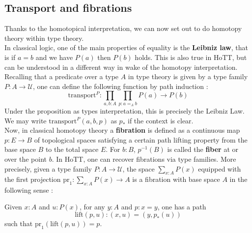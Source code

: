 \documentclass{report}
\begin{document}
\subsection{Transport and fibrations}
Thanks to the homotopical interpretation, we can now set out to do homotopy theory within type theory.\\
In classical logic, one of the main properties of equality is the \textbf{Leibniz law}, that is if $a=b$ and we have $P(a)$ then $P(b)$ holds. This is also true in HoTT, but can be understood in a different way in wake of the homotopy interpretation. Recalling that a predicate over a type $A$ in type theory is given by a type family $P : A \rightarrow \mathcal{U}$, one can define the following function by path induction :
$$\mathrm{transport}^P : \prod_{a,b : A} \prod_{p : a=_A b} P(a) \rightarrow P(b)$$
Under the proposition as types interpretation, this is precisely the Leibniz Law. We may write $\mathrm{transport}^P(a,b,p)$ as $p_*$ if the context is clear.\\
Now, in classical homotopy theory a \textbf{fibration} is defined as a continuous map $p : E \rightarrow B$ of topological spaces satisfying a certain path lifting property from the base space $B$ to the total space $E$. For $b : B$, $p^{-1}(B)$ is called the \textbf{fiber} at or over the point $b$. In HoTT, one can recover fibrations via type families. More precisely, given a type family $P : A \rightarrow \mathcal{U}$, the space $ \sum_{x : A} P(x)$ equipped with the first projection $\mathrm{pr}_1 : \sum_{x : A} P(x) \rightarrow A$ is a fibration with base space $A$ in the following sense : 
\begin{prop}
  Given $x : A$ and $u : P(x)$, for any $y : A$ and $p : x=y$, one has a path 
  $$\mathrm{lift}(p,u) : (x,u) = (y,p_*(u))$$
  such that $\mathrm{pr}_1(\mathrm{lift}(p,u)) = p$.
\end{prop}
\begin{center}
\end{center}
\end{document}
